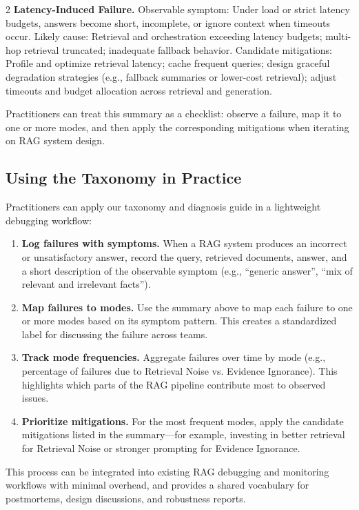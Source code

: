 \documentclass[11pt,a4paper]{article}
\begin{document}
\begin{multicols}{2}
\textbf{Latency-Induced Failure.}
Observable symptom: Under load or strict latency budgets, answers become short, incomplete, or ignore context when timeouts occur.
Likely cause: Retrieval and orchestration exceeding latency budgets; multi-hop retrieval truncated; inadequate fallback behavior.
Candidate mitigations: Profile and optimize retrieval latency; cache frequent queries; design graceful degradation strategies (e.g., fallback summaries or lower-cost retrieval); adjust timeouts and budget allocation across retrieval and generation.

Practitioners can treat this summary as a checklist: observe a failure, map it to one or more modes, and then apply the corresponding mitigations when iterating on RAG system design.

\subsection{Using the Taxonomy in Practice}

Practitioners can apply our taxonomy and diagnosis guide in a lightweight debugging workflow:
\begin{enumerate}[leftmargin=*,nosep]
\item \textbf{Log failures with symptoms.} When a RAG system produces an incorrect or unsatisfactory answer, record the query, retrieved documents, answer, and a short description of the observable symptom (e.g., ``generic answer'', ``mix of relevant and irrelevant facts'').
\item \textbf{Map failures to modes.} Use the summary above to map each failure to one or more modes based on its symptom pattern. This creates a standardized label for discussing the failure across teams.
\item \textbf{Track mode frequencies.} Aggregate failures over time by mode (e.g., percentage of failures due to Retrieval Noise vs. Evidence Ignorance). This highlights which parts of the RAG pipeline contribute most to observed issues.
\item \textbf{Prioritize mitigations.} For the most frequent modes, apply the candidate mitigations listed in the summary---for example, investing in better retrieval for Retrieval Noise or stronger prompting for Evidence Ignorance.
\end{enumerate}
This process can be integrated into existing RAG debugging and monitoring workflows with minimal overhead, and provides a shared vocabulary for postmortems, design discussions, and robustness reports.



\end{multicols}
\end{document}
